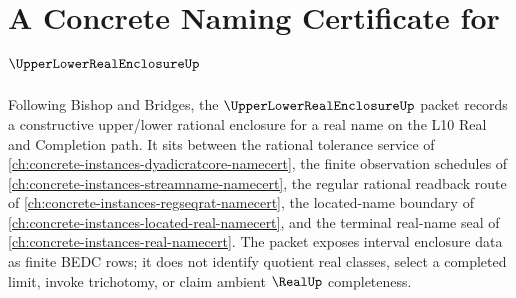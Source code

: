 \chapter{A Concrete Naming Certificate for $\UpperLowerRealEnclosureUp$}
\label{ch:concrete-instances-upper-lower-real-enclosure-namecert}

Following Bishop and Bridges, the $\UpperLowerRealEnclosureUp$ packet records a constructive upper/lower rational enclosure for a real name on the L10 Real and Completion path. It sits between the rational tolerance service of \autoref{ch:concrete-instances-dyadicratcore-namecert}, the finite observation schedules of \autoref{ch:concrete-instances-streamname-namecert}, the regular rational readback route of \autoref{ch:concrete-instances-regseqrat-namecert}, the located-name boundary of \autoref{ch:concrete-instances-located-real-namecert}, and the terminal real-name seal of \autoref{ch:concrete-instances-real-namecert}. The packet exposes interval enclosure data as finite BEDC rows; it does not identify quotient real classes, select a completed limit, invoke trichotomy, or claim ambient $\RealUp$ completeness.

